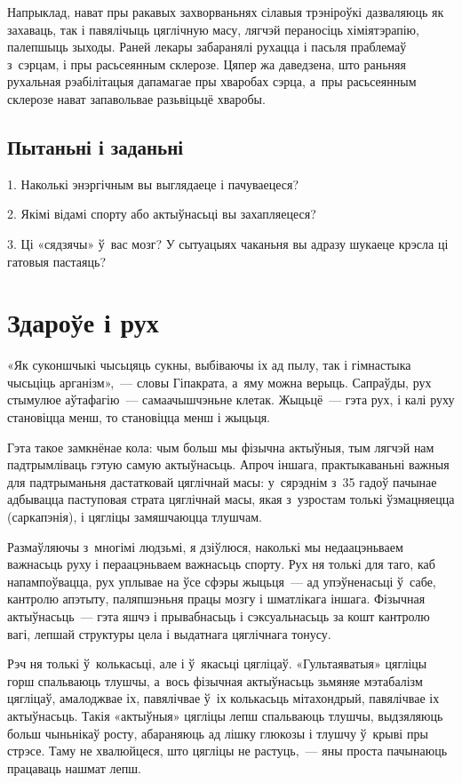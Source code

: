 Напрыклад, нават пры ракавых захворваньнях сілавыя трэніроўкі дазваляюць як захаваць, так і павялічыць цяглічную масу, лягчэй пераносіць хіміятэрапію, палепшыць зыходы. Раней лекары забаранялі рухацца і пасьля праблемаў з~сэрцам, і пры расьсеянным склерозе. Цяпер жа даведзена, што раньняя рухальная рэабілітацыя дапамагае пры хваробах сэрца, а~пры расьсеянным склерозе нават запавольвае разьвіцьцё хваробы.

\subsection*{Пытаньні і заданьні}

1. Наколькі энэргічным вы выглядаеце і пачуваецеся?

2. Якімі відамі спорту або актыўнасьці вы захапляецеся?

3. Ці «сядзячы» ў~вас мозг? У сытуацыях чаканьня вы адразу шукаеце крэсла ці гатовыя пастаяць?


\section{Здароўе і рух}

«Як суконшчыкі чысьцяць сукны, выбіваючы іх ад пылу, так і гімнастыка чысьціць арганізм»,~--- словы Гіпакрата, а~яму можна верыць. Сапраўды, рух стымулюе аўтафагію~--- самаачышчэньне клетак. Жыцьцё~--- гэта рух, і калі руху становіцца менш, то становіцца менш і жыцьця.

Гэта такое замкнёнае кола: чым больш мы фізычна актыўныя, тым лягчэй нам падтрымліваць гэтую самую актыўнасьць. Апроч іншага, практыкаваньні важныя для падтрыманьня дастатковай цяглічнай масы: у~сярэднім з~35 гадоў пачынае адбывацца паступовая страта цяглічнай масы, якая з~узростам толькі ўзмацняецца (саркапэнія), і цягліцы замяшчаюцца тлушчам.

Размаўляючы з~многімі людзьмі, я дзіўлюся, наколькі мы недаацэньваем важнасьць руху і пераацэньваем важнасьць спорту. Рух ня толькі для таго, каб напампоўвацца, рух уплывае на ўсе сфэры жыцьця~--- ад упэўненасьці ў~сабе, кантролю апэтыту, паляпшэньня працы мозгу і шматлікага іншага. Фізычная актыўнасьць~--- гэта яшчэ і прывабнасьць і сэксуальнасьць за кошт кантролю вагі, лепшай структуры цела і выдатнага цяглічнага тонусу.

Рэч ня толькі ў~колькасьці, але і ў~якасьці цягліцаў. «Гультаяватыя» цягліцы горш спальваюць тлушчы, а~вось фізычная актыўнасьць зьмяняе мэтабалізм цягліцаў, амалоджвае іх, павялічвае ў~іх колькасьць мітахондрый, павялічвае іх актыўнасьць. Такія «актыўныя» цягліцы лепш спальваюць тлушчы, выдзяляюць больш чыньнікаў росту, абараняюць ад лішку глюкозы і тлушчу ў~крыві пры стрэсе. Таму не хвалюйцеся, што цягліцы не растуць,~--- яны проста пачынаюць працаваць нашмат лепш.


